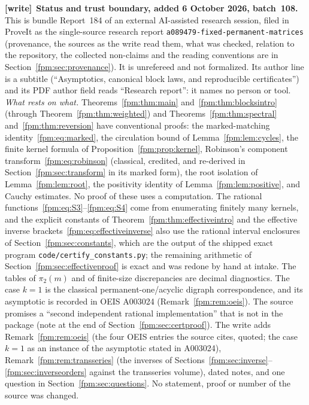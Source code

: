 \documentclass[11pt]{article}
\theoremstyle{definition}\newtheorem{definition}[theorem]{Definition}
\theoremstyle{remark}\newtheorem{remark}[theorem]{Remark}
\newcommand{\file}[1]{\nolinkurl{#1}}
\newenvironment{writenote}[1][]{\par\smallskip\begingroup\small
 \noindent\textbf{[write]}\if\relax\detokenize{#1}\relax\else~\textbf{#1.}\fi\ }%
 {\par\endgroup\smallskip}
\begin{document}
\begin{writenote}[Status and trust boundary, added 6 October 2026, batch~108]
This is bundle Report~184 of an external AI-assisted research session, filed
in ProveIt as the single-source research report
\file{a089479-fixed-permanent-matrices} (provenance, the sources as the write
read them, what was checked, relation to the repository, the collected
non-claims and the reading conventions are in
Section~\ref{fpm:sec:provenance}). It is unrefereed and not formalized. Its
author line is a subtitle (``Asymptotics, canonical block laws, and
reproducible certificates'') and its PDF author field reads ``Research
report'': it names no person or tool. \emph{What rests on what.}
Theorems~\ref{fpm:thm:main} and~\ref{fpm:thm:blocksintro} (through
Theorem~\ref{fpm:thm:weighted}) and Theorems~\ref{fpm:thm:spectral}
and~\ref{fpm:thm:reversion} have conventional proofs: the marked-matching
identity~\eqref{fpm:eq:marked}, the circulation bound of
Lemma~\ref{fpm:lem:cycles}, the finite kernel formula of
Proposition~\ref{fpm:prop:kernel}, Robinson's component
transform~\eqref{fpm:eq:robinson} (classical, credited, and re-derived in
Section~\ref{fpm:sec:transform} in its marked form), the root isolation of
Lemma~\ref{fpm:lem:root}, the positivity identity of
Lemma~\ref{fpm:lem:positive}, and Cauchy estimates. No proof of these uses a
computation. The rational functions~\eqref{fpm:eq:S3}--\eqref{fpm:eq:S4}
come from enumerating finitely many kernels, and the explicit constants of
Theorem~\ref{fpm:thm:effectiveintro} and the effective inverse
brackets~\eqref{fpm:eq:effectiveinverse} also use the rational interval
enclosures of Section~\ref{fpm:sec:constants}, which are the output of the
shipped exact program \file{code/certify_constants.py}; the remaining
arithmetic of Section~\ref{fpm:sec:effectiveproof} is exact and was redone by
hand at intake. The tables of $\pi_2(m)$ and of finite-size discrepancies are
decimal diagnostics. The case $k=1$ is the classical permanent-one/acyclic
digraph correspondence, and its asymptotic is recorded in OEIS A003024
(Remark~\ref{fpm:rem:oeis}). The source promises a ``second independent
rational implementation'' that is not in the package (note at the end of
Section~\ref{fpm:sec:certproof}). The write adds
Remark~\ref{fpm:rem:oeis} (the four OEIS entries the source cites, quoted;
the case $k=1$ as an instance of the asymptotic stated in A003024),
Remark~\ref{fpm:rem:transseries} (the inverses of
Sections~\ref{fpm:sec:inverse}--\ref{fpm:sec:inverseorders} against the
transseries volume), dated notes, and one question in
Section~\ref{fpm:sec:questions}. No statement, proof or number of the source
was changed.
\end{writenote}
\end{document}
